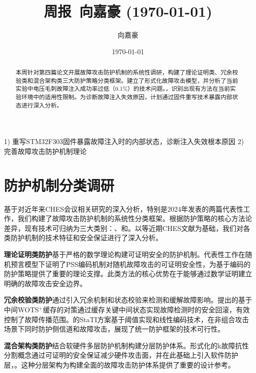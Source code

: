 \documentclass{article}
\title{周报~向嘉豪 (\today)}
\author{向嘉豪}
\date{\today}
\begin{document}
\maketitle

\begin{abstract}
  本周针对第四篇论文开展故障攻击防护机制的系统性调研，构建了理论证明类、冗余校验类和混合架构类三大防护策略分类框架。建立了形式化故障攻击模型，并分析了当前实验中电压毛刺故障注入成功率过低（0.1\%）的技术问题。，识别出现有方法在当前实验环境中的适用性限制。为诊断故障注入失效原因，计划通过固件重写技术暴露内部状态进行深入分析。
\end{abstract}

\begin{weekplan}
1) 重写STM32F303固件暴露故障注入时的内部状态，诊断注入失效根本原因 2) 完善故障攻击防护机制理论
\end{weekplan}

\section{防护机制分类调研}

基于对近年来CHES会议相关研究的深入分析，特别是2024年发表的两篇代表性工作，我们构建了故障攻击防护机制的系统性分类框架。根据防护策略的核心方法论差异，现有技术可归纳为三大类别：、和。以\cite{TCHES:Genet23,TCHES:DhoOvcTop24,TCHES:THNABC24}等近期CHES文献为基础，我们对各类防护机制的技术特征和安全保证进行了深入分析。

\textbf{理论证明类防护}基于严格的数学理论构建可证明安全的防护机制。代表性工作\cite{AC:CorMan09}在随机预言模型下证明了PSS编码机制对随机故障攻击的可证明安全性，为基于编码的防护策略提供了重要的理论支撑。此类方法的核心优势在于能够通过数学证明建立明确的故障攻击安全边界。

\textbf{冗余校验类防护}通过引入冗余机制和状态校验来检测和缓解故障影响。\cite{TCHES:Genet23}提出的基于中间WOTS$^{+}$缓存的对策通过缓存关键中间状态实现故障检测时的安全回滚，有效控制了故障传播范围。\cite{TCHES:DhoOvcTop24}的StaTI方案基于阈值实现和线性编码技术，在非组合攻击场景下同时防护侧信道和故障攻击，展现了统一防护框架的技术可行性。

\textbf{混合架构类防护}结合软硬件多层防护机制构建分层防护体系。\cite{TCHES:THNABC24}形式化的k故障抗性分割概念通过可证明的安全保证减少硬件攻击面，并在此基础上引入软件防护层，。这种分层架构为构建全面的故障攻击防护体系提供了重要的设计参考。
\end{document}
